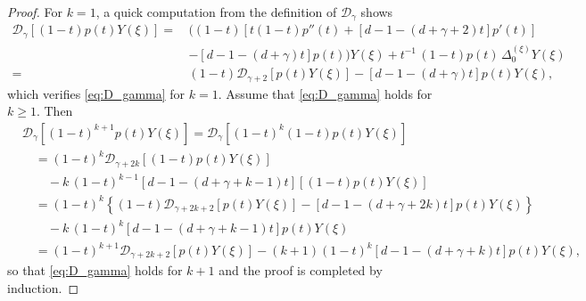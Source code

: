 \documentclass{amsart}
\newtheorem{lem}[thm]{Lemma}
\theoremstyle{remark}
\def\g{{\gamma}}
\def\CD{{\mathcal D}}
\def\CH{{\mathcal H}}
\def\RR{{\mathbb R}}
\begin{document}
\begin{proof}
For $k=1$, a quick computation from the definition of $\CD_{\g}$ shows
\begin{align*}
\CD_{\g}[(1-t)  p(t) Y(\xi)]
 =\, & \big((1-t) \left[t(1-t)p''(t) +  [d-1-(d+\gamma+2)t]p'(t)\right] \\
    &  - [d-1-(d+\gamma)t]p(t)\big) Y(\xi)
     + t^{-1}\,(1-t) p(t) \, \Delta_0^{(\xi)}Y(\xi) \\
= \, & (1-t)\CD_{\gamma+2}[p(t)Y(\xi)] - [d-1-(d+\gamma)t]p(t)Y(\xi),
\end{align*}
which verifies \eqref{eq:D_gamma} for $k=1$. Assume that \eqref{eq:D_gamma} holds for $k\geq 1$.
Then
\begin{align*}
& \CD_{\gamma}[(1-t)^{k+1} p(t) Y(\xi)] = \CD_{\g} [(1-t)^k (1-t) p(t) Y(\xi)] \\
& \quad = (1-t)^k \CD_{\g+2k}[(1-t)p(t) Y(\xi)] \\
&\qquad - k\,(1-t)^{k-1} [d-1-(d+\gamma+k-1)t][(1-t)p(t) Y(\xi)]\\
& \quad =  (1-t)^k \left\{(1-t)\CD_{\g+2k+2}[p(t) Y(\xi)] - [d-1-(d+\gamma+2k)t]p(t) Y(\xi)\right\}\\
&\qquad - k\,(1-t)^{k} [d-1-(d+\gamma+k-1)t]p(t) Y(\xi)\\
& \quad = (1-t)^{k+1} \CD_{\g+2k+2}[p(t) Y(\xi)] - (k+1)(1-t)^k [d-1-(d+\gamma+k)t]p(t) Y(\xi),
\end{align*}
so that \eqref{eq:D_gamma} holds for $k+1$ and the proof is completed by induction.
\end{proof}

\end{document}

